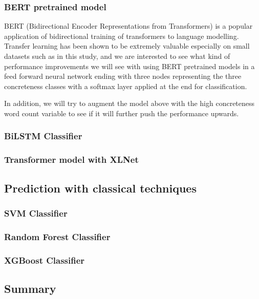\documentclass[12pt, a4paper]{article}
\begin{document}
\subsubsection{BERT pretrained model}
BERT (Bidirectional Encoder Representations from Transformers) \cite{bert} is a popular application of bidirectional training of transformers to language modelling. Transfer learning has been shown to be extremely valuable especially on small datasets such as in this study, and we are interested to see what kind of performance improvements we will see with using BERT pretrained models in a feed forward neural network ending with three nodes representing the three concreteness classes with a softmax layer applied at the end for classification.

In addition, we will try to augment the model above with the high concreteness word count variable to see if it will further push the performance upwards.

\subsubsection{BiLSTM Classifier}

\subsubsection{Transformer model with XLNet}

\subsection{Prediction with classical techniques}

\subsubsection{SVM Classifier}

\subsubsection{Random Forest Classifier}

\subsubsection{XGBoost Classifier}
\subsection{Summary}
\end{document}
